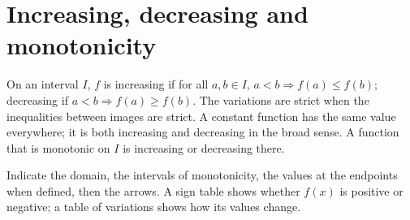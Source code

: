 \section{Increasing, decreasing and monotonicity}
\begin{cours}[Definitions]
On an interval $I$, $f$ is increasing if for all $a,b\in I$, $a<b\Rightarrow f(a)\leq f(b)$; decreasing if $a<b\Rightarrow f(a)\geq f(b)$. The variations are strict when the inequalities between images are strict. A constant function has the same value everywhere; it is both increasing and decreasing in the broad sense.
A function that is monotonic on $I$ is increasing or decreasing there.
\end{cours}
\begin{methode}
Indicate the domain, the intervals of monotonicity, the values at the endpoints when defined, then the arrows. A sign table shows whether $f(x)$ is positive or negative; a table of variations shows how its values change.
\end{methode}

